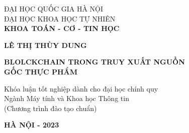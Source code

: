 \begin{titlepage}
    \thispagestyle{empty}
    \begin{center}        
        {\fontsize{14}{10}\selectfont 
        ĐẠI HỌC QUỐC GIA HÀ NỘI\\
        ĐẠI HỌC KHOA HỌC TỰ NHIÊN\\
        \fontsize{13}{16}\selectfont \textbf{KHOA TOÁN - CƠ - TIN HỌC}
        }
        \end{center}
        
        \vspace*{3cm}
        
        \begin{center}
            {
    
                \fontsize{14}{0}\selectfont \textbf{LÊ THỊ THÙY DUNG}
            }
        \end{center}
        \begin{center}
       
        \vspace*{3cm}
        { 
            \fontsize{18}{24}\selectfont \textbf{ BLOLCKCHAIN TRONG TRUY XUẤT NGUỒN \\ GỐC THỰC PHẨM}}
        \end{center}
        \vspace*{2cm}
        \begin{center}
        {
        \fontsize{14}{16}\selectfont Khóa luận tốt nghiệp dành cho đại học chính quy \\
        \fontsize{14}{16}\selectfont Ngành Máy tính và Khoa học Thông tin \\
        (Chương trình đào tạo chuẩn)
        }
        \end{center}
        
        \vfill
         \centerline{
            \fontsize{14}{0}\selectfont \textbf{ HÀ NỘI - 2023}}
        
    \end{titlepage}
    
    